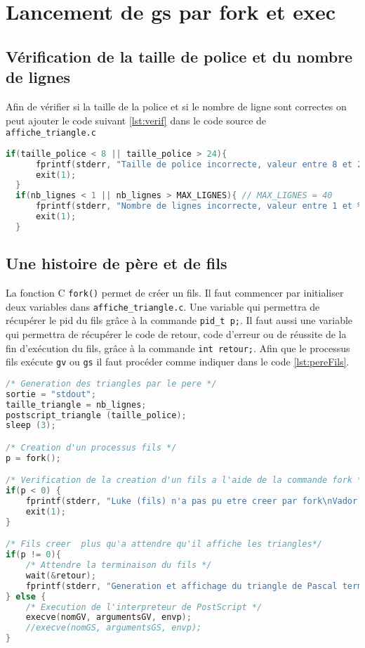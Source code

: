 \section{Lancement de gs par fork et exec}
\subsection{Vérification de la taille de police et du nombre de lignes}

Afin de vérifier si la taille de la police et si le nombre de ligne sont correctes on peut ajouter le code suivant \ref{lst:verif} dans le code source de \verb!affiche_triangle.c!

\begin{lstlisting}[language=C, label={lst:verif}, caption={Vérification de la taille de police comprise entre 8 et 24, et du nombre de lignes comprit entre 1 et 40.}]
  if(taille_police < 8 || taille_police > 24){
	  fprintf(stderr, "Taille de police incorrecte, valeur entre 8 et 24 attendue\n");
	  exit(1);
  }
  if(nb_lignes < 1 || nb_lignes > MAX_LIGNES){ // MAX_LIGNES = 40
	  fprintf(stderr, "Nombre de lignes incorrecte, valeur entre 1 et %d attendue\n", MAX_LIGNES);
	  exit(1);
  }
\end{lstlisting}

\subsection{Une histoire de père et de fils}
La fonction C \verb!fork()! permet de créer un fils. 
Il faut commencer par initialiser deux variables dans \verb!affiche_triangle.c!.
Une variable qui permettra de récupérer le pid du fils grâce à la commande \verb!pid_t p;!.
Il faut aussi une variable qui permettra de récupérer le code de retour, code d'erreur ou de réussite de la fin d'exécution du fils, grâce à la commande \verb!int retour;!.
Afin que le processus fils exécute \verb!gv! ou \verb!gs! il faut procéder comme indiquer dans le code \ref{lst:pereFils}.

\begin{lstlisting}[language=C, label={lst:pereFils}, caption={Création d'un fils qui execute la fonction execve permettant la lecture du fichier PostScript par un interpréteur de PostScript.}]
/* Generation des triangles par le pere */
sortie = "stdout";
taille_triangle = nb_lignes;
postscript_triangle (taille_police);
sleep (3);

/* Creation d'un processus fils */
p = fork();

/* Verification de la creation d'un fils a l'aide de la commande fork */
if(p < 0) {
	fprintf(stderr, "Luke (fils) n'a pas pu etre creer par fork\nVador (pere) est triste\n");
	exit(1);
}

/* Fils creer  plus qu'a attendre qu'il affiche les triangles*/
if(p != 0){
	/* Attendre la terminaison du fils */
	wait(&retour);
	fprintf(stderr, "Generation et affichage du triangle de Pascal termine\n");
} else {	
	/* Execution de l'interpreteur de PostScript */
	execve(nomGV, argumentsGV, envp);
	//execve(nomGS, argumentsGS, envp);
}
\end{lstlisting}
